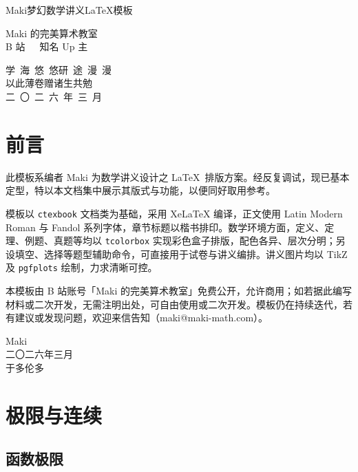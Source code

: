 \documentclass[a4paper,12pt,oneside,fontset=none]{ctexbook}
\newcommand{\MakeTitlePage}{%
	\begin{titlepage}
		\centering
		\vspace*{5cm}
		
		{\fontsize{48pt}{60pt}\selectfont\heavykaishu \color{LogicColor} Maki梦幻数学讲义LaTeX模板\par}
		
		\vfill
		
		{\LARGE \kaishu 
			Maki 的完美算术教室
			\\[0.8em]
			\Large
			B 站\ \ \ 知名 Up 主
			\\
		}
		
		\vspace{2.3cm}
		
		{\Large \kaishu
			学\ 海\ 悠\ 悠\quad 研\ 途\ 漫\ 漫
			\\[0.3em]
			{\Large 以此薄卷赠诸生共勉}
			\\[2.5em]
			
			二\ 〇\ 二\ 六\ 年\ 三\ 月 
		}
		
		\vspace{2cm}
	\end{titlepage}%
}
\numberwithin{equation}{chapter}
\begin{document}
	
	\frontmatter
	
	\MakeTitlePage
	
	
	
	\chapter*{前言}
	此模板系编者 Maki 为数学讲义设计之 \LaTeX\ 排版方案。经反复调试，现已基本定型，特以本文档集中展示其版式与功能，以便同好取用参考。
	
	模板以 \texttt{ctexbook} 文档类为基础，采用 XeLaTeX 编译，正文使用 Latin Modern Roman 与 Fandol 系列字体，章节标题以楷书排印。数学环境方面，定义、定理、例题、真题等均以 \texttt{tcolorbox} 实现彩色盒子排版，配色各异、层次分明；另设填空、选择等题型辅助命令，可直接用于试卷与讲义编排。讲义图片均以 TikZ 及 \texttt{pgfplots} 绘制，力求清晰可控。
	
	本模板由 B 站账号「Maki 的完美算术教室」免费公开，允许商用；如若据此编写材料或二次开发，无需注明出处，可自由使用或二次开发。模板仍在持续迭代，若有建议或发现问题，欢迎来信告知（maki@maki-math.com）。
	
	\vspace{3cm}
	
	\hfill
	\begin{minipage}{5cm}
		\centering
		Maki \\
		二〇二六年三月\\
		于多伦多
	\end{minipage}
	
	
	
	
	\tableofcontents
	
	
	\mainmatter
	
	
	
	
	
	
	
	
	\chapter{极限与连续}
	
	\section{函数极限}
	
\end{document}
